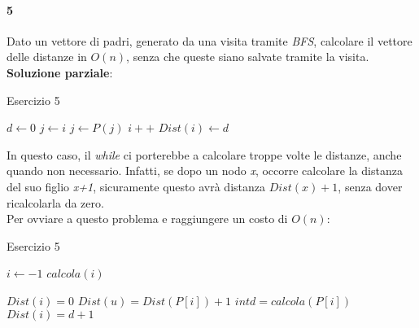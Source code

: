 \paragraph{5}
Dato un vettore di padri, generato da una visita tramite \textit{BFS}, calcolare il vettore delle distanze in $O(n)$, senza che queste siano salvate tramite la visita. \\
\textbf{Soluzione parziale}: \hfill
\begin{algorithm}
	\caption{Esercizio 5}\label{alg:es5}
	\begin{algorithmic}[1]
			\State $d \gets 0$
			\State $j \gets i$
				\State $j \gets P(j)$
				\State $i++$
			\EndWhile
			\State $Dist(i) \gets d$
		\EndFor
		\EndFunction
	\end{algorithmic}
\end{algorithm}
\hfill
In questo caso, il \textit{while} ci porterebbe a calcolare troppe volte le distanze, anche quando non necessario. Infatti, se dopo un nodo \textit{x}, occorre calcolare la distanza del suo figlio \textit{x+1}, sicuramente questo avrà distanza $Dist(x)+1$, senza dover ricalcolarla da zero. \\
Per ovviare a questo problema e raggiungere un costo di $O(n)$:
\begin{algorithm}
	\caption{Esercizio 5}\label{alg:es5-2}
	\begin{algorithmic}[1]
		\State $i \gets -1$
				\State $calcola(i)$
			\EndIf
		\EndFor
		\EndFunction
	\end{algorithmic}
	\begin{algorithmic}[1]
			\State $ Dist(i) = 0 $
			\State $ Dist(u) = Dist(P[i]) + 1$
		\Else
			\State $int d = calcola(P[i])$
			\State $Dist(i) = d+1$
		\EndIf
		\EndFunction
	\end{algorithmic}
\end{algorithm}
\newpage

